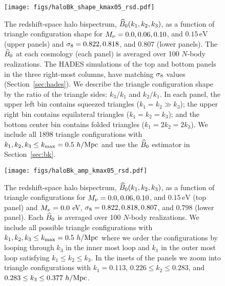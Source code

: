 \begin{figure}
\begin{center}
    \texttt{[image: figs/haloBk\_shape\_kmax05\_rsd.pdf]} 
    \caption{The redshift-space halo bispectrum, $\widehat{B}_0(k_1, k_2, k_3)$, as a 
    function of triangle configuration shape for $M_\nu = 0.0, 0.06, 0.10$, 
    and $0.15\,\mathrm{eV}$ (upper panels) and $\sigma_8 = 0.822, 0.818$, and 
    $0.807$ (lower panels). The $\widehat{B}_0$ at each cosmology (each panel) is 
    averaged over 100 $N$-body realizations. The HADES simulations of the top 
    and bottom panels in the three right-most columns, have matching $\sigma_8$ values 
    (Section~\ref{sec:hades}). We describe the triangle configuration shape 
    by the ratio of the triangle sides: $k_3/k_1$ and $k_2/k_1$. In each
    panel, the upper left bin contains squeezed triangles ($k_1 = k_2 \gg k_3$); 
    the upper right bin contains equilateral triangles ($k_1 = k_2 = k_3$); 
    and the bottom center bin contains folded triangles ($k_1 = 2 k_2 = 2 k_3$). 
    We include all 1898 triangle configurations with 
    $k_1, k_2, k_3 \leq k_{\rm max} = 0.5~h/{\rm Mpc}$ and use the $\widehat{B}_0$ estimator in Section~\ref{sec:bk}.}
\label{fig:bk_shape}
\end{center}
\end{figure}

\begin{figure}
\begin{center}
\texttt{[image: figs/haloBk\_amp\_kmax05\_rsd.pdf]}
    \caption{The redshift-space halo bispectrum, $\widehat{B}_0(k_1, k_2, k_3)$, as a
    function of triangle configurations for $M_\nu = 0.0, 0.06, 0.10$, 
    and $0.15\,\mathrm{eV}$ (top panel) and $M_\nu = 0.0$ eV, $\sigma_8 = 0.822, 0.818, 0.807$, 
    and $0.798$ (lower panel). Each $\widehat{B}_0$ is averaged over 100 $N$-body 
    realizations. We include all possible triangle configurations 
    with $k_1, k_2, k_3 \leq k_{\rm max} = 0.5~h/{\rm Mpc}$ where we order
    the configurations by looping through $k_3$ in the inner most loop and 
    $k_1$ in the outer most loop satisfying $k_1 \leq k_2 \leq k_3$. In the 
    insets of the panels we zoom into triangle configurations with 
    $k_1 = 0.113$, $0.226 \leq k_2 \leq 0.283$, and $0.283 \leq k_3 \leq 0.377~h/{\rm Mpc}$.}
\label{fig:bk_amp}
\end{center}
\end{figure}

